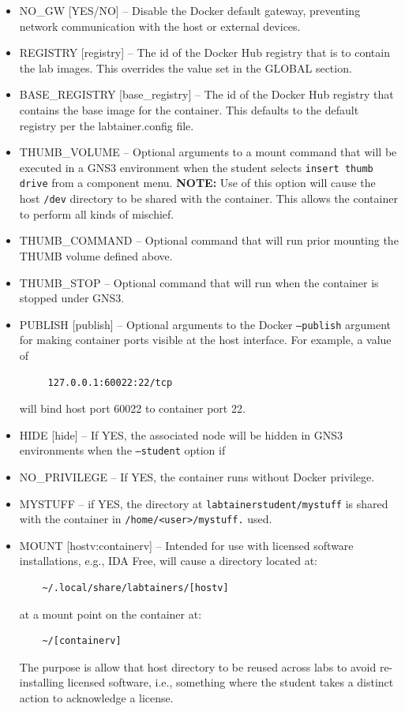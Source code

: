 \documentclass[12pt]{article}
\begin{document}
\begin{itemize}
\begin{itemize}
with the host VM or the internet\footnote{This replaces use of the set\_default\_gw.sh script from 
within fixlocal.sh scripts}.  This option will also replace the components resolv.conf with the given IP and will cause the
static route to the {\tt my\_host} address to be deleted.
\item NO\_GW [YES/NO] -- Disable the Docker default gateway, preventing network communication with the host or external devices.
\item REGISTRY [registry] -- The id of the Docker Hub registry that is to contain the lab images. This overrides the value
set in the GLOBAL section. 
\item BASE\_REGISTRY [base\_registry] -- The id of the Docker Hub registry that contains the base image for the container.  This defaults
to the default registry per the labtainer.config file.
\item THUMB\_VOLUME -- Optional arguments to a mount command that will be executed in a GNS3 environment when the student selects
{\tt insert thumb drive} from a component menu.  \textbf{NOTE:} Use of this option will cause the host {\tt /dev} directory to be shared
with the container.  This allows the container to perform all kinds of mischief.
\item THUMB\_COMMAND -- Optional command that will run prior mounting the THUMB volume defined above.
\item THUMB\_STOP -- Optional command that will run when the container is stopped under GNS3.
\item PUBLISH [publish] -- Optional arguments to the Docker {\tt --publish} argument for making container ports visible at the
host interface.  For example, a value of 
\begin{verbatim}
     127.0.0.1:60022:22/tcp
\end{verbatim}
\noindent will bind host port 60022 to container port 22.
\item HIDE [hide] -- If YES, the associated node will be hidden in GNS3 environments when the {\tt --student} option if
\item NO\_PRIVILEGE -- If YES, the container runs without Docker privilege.
\item MYSTUFF -- if YES, the directory at {\tt labtainerstudent/mystuff} is shared with the container in {\tt /home/<user>/mystuff.}
used.
\item MOUNT [hostv:containerv] -- Intended for use with licensed software installations, e.g., IDA Free, will cause a directory 
located at:
\begin{verbatim}
    ~/.local/share/labtainers/[hostv]
\end{verbatim}
\noindent at a mount point on the container at:
\begin{verbatim}
    ~/[containerv]
\end{verbatim}
\noindent The purpose is allow that host directory to be reused across labs to avoid re-installing licensed software, i.e.,
something where the student takes a distinct action to acknowledge a license.
\end{itemize}
\end{itemize}
  
\end{document}
